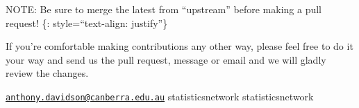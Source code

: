 \documentclass[
]{article}
\theoremstyle{definition}
\theoremstyle{definition}
\theoremstyle{definition}
\theoremstyle{definition}
\theoremstyle{remark}
\begin{document}
NOTE: Be sure to merge the latest from ``upstream'' before making a pull request!
\{: style=``text-align: justify''\}

If you're comfortable making contributions any other way, please feel free to do it your way and send us the pull request, message or email and we will gladly review the changes.

\href{mailto:anthony.davidson@canberra.edu.au}{\nolinkurl{anthony.davidson@canberra.edu.au}}
statisticsnetwork
statisticsnetwork

  
\end{document}
